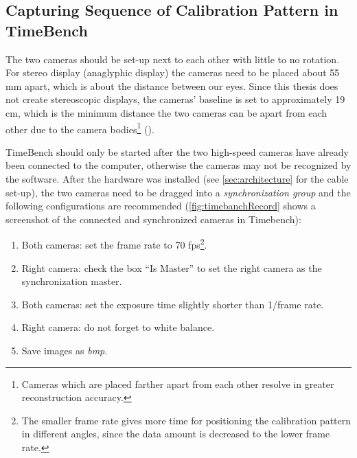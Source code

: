 \subsection{Capturing Sequence of Calibration Pattern in TimeBench}\label{ssec:PatternSequence}
The two cameras should be set-up next to each other with little to no rotation. For stereo display (anaglyphic display) the cameras need to be placed about 55 mm apart, which is about the distance between our eyes. Since this thesis does not create stereoscopic displays, the cameras' baseline is set to approximately 19 cm, which is the minimum distance the two cameras can be apart from each other due to the camera bodies\footnote{Cameras which are placed farther apart from each other resolve in greater reconstruction accuracy.} (\cite{StereoCalib.2016}).  

TimeBench should only be started after the two high-speed cameras have already been connected to the computer, otherwise the cameras may not be recognized by the software. After the hardware was installed (see \autoref{sec:architecture} for the cable set-up), the two cameras need to be dragged into a \textit{synchronization group} and the following configurations are recommended (\autoref{fig:timebanchRecord} shows a screenshot of the connected and synchronized cameras in Timebench): 

\begin{enumerate}[i]
\item Both cameras: set the frame rate to 70 fps\footnote{The smaller frame rate gives more time for positioning the calibration pattern in different angles, since the data amount is decreased to the lower frame rate.}.
\item Right camera: check the box \enquote{Is Master} to set the right camera as the synchronization master.
\item Both cameras: set the exposure time slightly shorter than 1/frame rate.
\item Right camera: do not forget to white balance.
\item Save images as \textit{bmp}.
\end{enumerate}

